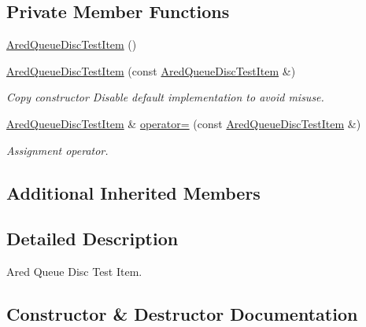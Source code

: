 \subsection*{Private Member Functions}
\begin{DoxyCompactItemize}
\item 
\hyperlink{classAredQueueDiscTestItem_a9ea4d1554b395dca8ddaf61548f1edc5}{Ared\+Queue\+Disc\+Test\+Item} ()
\item 
\hyperlink{classAredQueueDiscTestItem_aca4ba0a9dc22d5237e511d8f47006f14}{Ared\+Queue\+Disc\+Test\+Item} (const \hyperlink{classAredQueueDiscTestItem}{Ared\+Queue\+Disc\+Test\+Item} \&)
\begin{DoxyCompactList}\small\item\em Copy constructor Disable default implementation to avoid misuse. \end{DoxyCompactList}\item 
\hyperlink{classAredQueueDiscTestItem}{Ared\+Queue\+Disc\+Test\+Item} \& \hyperlink{classAredQueueDiscTestItem_afaf2321810bdf5aab51afa33e2dd7b06}{operator=} (const \hyperlink{classAredQueueDiscTestItem}{Ared\+Queue\+Disc\+Test\+Item} \&)
\begin{DoxyCompactList}\small\item\em Assignment operator. \end{DoxyCompactList}\end{DoxyCompactItemize}
\subsection*{Additional Inherited Members}


\subsection{Detailed Description}
Ared Queue Disc Test Item. 

\subsection{Constructor \& Destructor Documentation}

